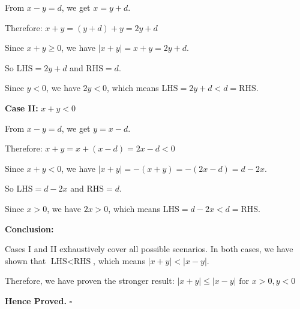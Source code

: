 From $x - y = d$, we get $x = y + d$.

Therefore: $x + y = (y + d) + y = 2y + d$

Since $x + y \geq 0$, we have $|x + y| = x + y = 2y + d$.

So $\text{LHS} = 2y + d$ and $\text{RHS} = d$.

Since $y < 0$, we have $2y < 0$, which means $\text{LHS} = 2y + d < d = \text{RHS}$.

\vspace{1em}

\textbf{Case II:} $x + y < 0$

From $x - y = d$, we get $y = x - d$.

Therefore: $x + y = x + (x - d) = 2x - d < 0$

Since $x + y < 0$, we have $|x + y| = -(x + y) = -(2x - d) = d - 2x$.

So $\text{LHS} = d - 2x$ and $\text{RHS} = d$.

Since $x > 0$, we have $2x > 0$, which means $\text{LHS} = d - 2x < d = \text{RHS}$.

\vspace{1em}

\textbf{Conclusion:}

Cases I and II exhaustively cover all possible scenarios. In both cases, we have shown that $\text{LHS} < \text{RHS}$, which means $|x + y| < |x - y|$.

Therefore, we have proven the stronger result: $\boxed{|x + y| \leq |x - y| \text{ for } x > 0, y < 0}$

\textbf{Hence Proved.} $\square$